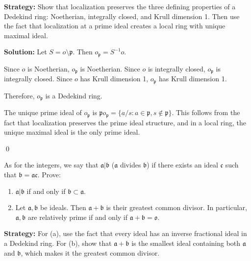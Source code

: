 \noindent\textbf{Strategy:} Show that localization preserves the three defining properties of a Dedekind ring: Noetherian, integrally closed, and Krull dimension 1. Then use the fact that localization at a prime ideal creates a local ring with unique maximal ideal.

\noindent\textbf{Solution:}
Let $S = o \setminus \mathfrak{p}$. Then $o_{\mathfrak{p}} = S^{-1}o$.

Since $o$ is Noetherian, $o_{\mathfrak{p}}$ is Noetherian. Since $o$ is integrally closed, $o_{\mathfrak{p}}$ is integrally closed. Since $o$ has Krull dimension 1, $o_{\mathfrak{p}}$ has Krull dimension 1.

Therefore, $o_{\mathfrak{p}}$ is a Dedekind ring.

The unique prime ideal of $o_{\mathfrak{p}}$ is $\mathfrak{p} o_{\mathfrak{p}} = \{a/s : a \in \mathfrak{p}, s \notin \mathfrak{p}\}$. This follows from the fact that localization preserves the prime ideal structure, and in a local ring, the unique maximal ideal is the only prime ideal.


\qed
\begin{problembox}
As for the integers, we say that $\mathfrak{a} | \mathfrak{b}$ ($\mathfrak{a}$ divides $\mathfrak{b}$) if there exists an ideal $\mathfrak{c}$ such that $\mathfrak{b} = \mathfrak{a}\mathfrak{c}$. Prove:
\begin{enumerate}[label=(\alph*)]
    \item $\mathfrak{a} | \mathfrak{b}$ if and only if $\mathfrak{b} \subset \mathfrak{a}$.
    \item Let $\mathfrak{a}, \mathfrak{b}$ be ideals. Then $\mathfrak{a} + \mathfrak{b}$ is their greatest common divisor. In particular, $\mathfrak{a}, \mathfrak{b}$ are relatively prime if and only if $\mathfrak{a} + \mathfrak{b} = \mathfrak{o}$.
\end{enumerate}
\end{problembox}

\noindent\textbf{Strategy:} For (a), use the fact that every ideal has an inverse fractional ideal in a Dedekind ring. For (b), show that $\mathfrak{a} + \mathfrak{b}$ is the smallest ideal containing both $\mathfrak{a}$ and $\mathfrak{b}$, which makes it the greatest common divisor.

